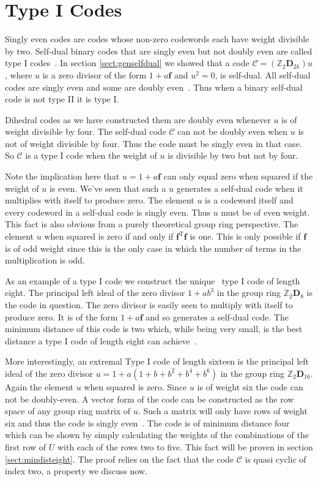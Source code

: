 \section{Type I Codes}
\label{sect:typeIcodes}
Singly even codes are codes whose non-zero codewords each have weight divisible by two.
Self-dual binary codes that are singly even but not doubly even are called type I codes~\cite[p.~339]{huf03}.
In section \ref{sect:genselfdual} we showed that a code $\mathcal{C} = (\mathbb{Z}_2 \mathbf{D}_{2k})u$, where $u$ is a zero divisor of the form $1 + a \mathbf{f}$ and $u^2 = 0$, is self-dual.
All self-dual codes are singly even and some are doubly even~\cite[p.~338]{huf03}.
Thus when a binary self-dual code is not type II it is type I.

Dihedral codes as we have constructed them are doubly even whenever $u$ is of weight divisible by four.
The self-dual code $\mathcal{C}$ can not be doubly even when $u$ is not of weight divisible by four.
Thus the code must be singly even in that case.
So $\mathcal{C}$ is a type I code when the weight of $u$ is divisible by two but not by four.

Note the implication here that $u = 1 + a \mathbf{f}$ can only equal zero when squared if the weight of $u$ is even.
We've seen that such a $u$ generates a self-dual code when it multiplies with itself to produce zero.
The element $u$ is a codeword itself and every codeword in a self-dual code is singly even.
Thus $u$ must be of even weight.
This fact is also obvious from a purely theoretical group ring perspective.
The element $u$ when squared is zero if and only if $\mathbf{f}^{\textrm{T}} \mathbf{f}$ is one.
This is only possible if $\mathbf{f}$ is of odd weight since this is the only case in which the number of terms in the multiplication is odd.

As an example of a type I code we construct the unique~\cite{huf05} type I code of length eight.
The principal left ideal of the zero divisor $1 + ab^3$ in the group ring $\mathbb{Z}_2 \mathbf{D}_{8}$ is the code in question.
The zero divisor is easily seen to multiply with itself to produce zero.
It is of the form $1 + a \mathbf{f}$ and so generates a self-dual code.
The minimum distance of this code is two which, while being very small, is the best distance a type I code of length eight can achieve~\cite{huf05}.

More interestingly, an extremal Type I code of length sixteen is the principal left ideal of the zero divisor $u = 1 + a(1 + b + b^2 + b^4 + b^6)$ in the group ring $\mathbb{Z}_2 \mathbf{D}_{16}$.
Again the element $u$ when squared is zero.
Since $u$ is of weight six the code can not be doubly-even.
A vector form of the code can be constructed as the row space of any group ring matrix of $u$.
Such a matrix will only have rows of weight six and thus the code is singly even~\cite[p.~11]{huf03}.
The code is of minimum distance four which can be shown by simply calculating the weights of the combinations of the first row of $U$ with each of the rows two to five.
This fact will be proven in section \ref{sect:mindisteight}.
The proof relies on the fact that the code $\mathcal{C}$ is quasi cyclic of index two, a property we discuss now.

